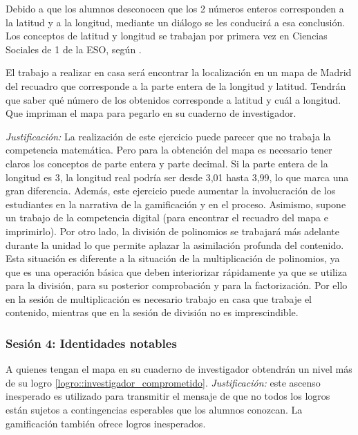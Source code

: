 Debido a que los alumnos desconocen que los 2 números enteros corresponden a la latitud y a la longitud, mediante un diálogo se les conducirá a esa conclusión.
%
Los conceptos de latitud y longitud se trabajan por primera vez en Ciencias Sociales de 1 de la ESO, según \bocm.


El trabajo a realizar en casa será encontrar la localización en un mapa de Madrid del recuadro que corresponde a la parte entera de la longitud y latitud.
%
Tendrán que saber qué número de los obtenidos corresponde a latitud y cuál a longitud.
%
Que impriman el mapa para pegarlo en su cuaderno de investigador.

\textit{
	Justificación:
}
%
La realización de este ejercicio puede parecer que no trabaja la competencia matemática. 
%
Pero para la obtención del mapa es necesario tener claros los conceptos de parte entera y parte decimal.
%
Si la parte entera de la longitud es 3, la longitud real podría ser desde 3,01 hasta 3,99, lo que marca una gran diferencia.
%
Además, este ejercicio puede aumentar la involucración de los estudiantes en la narrativa de la gamificación y en el proceso.
%
Asimismo, supone un trabajo de la competencia digital (para encontrar el recuadro del mapa e imprimirlo).
%
Por otro lado, la división de polinomios se trabajará más adelante durante la unidad lo que permite aplazar la asimilación profunda del contenido.
%
Esta situación es diferente a la situación de la multiplicación de polinomios, ya que es una operación básica que deben interiorizar rápidamente ya que se utiliza para la división, para su posterior comprobación y para la factorización.
%
Por ello en la sesión de multiplicación es necesario trabajo en casa que trabaje el contenido, mientras que en la sesión de división no es imprescindible.



\subsubsection{Sesión 4: Identidades notables}

A quienes tengan el mapa en su cuaderno de investigador obtendrán un nivel más de su logro \ref{logro::investigador_comprometido}.
%
\textit{Justificación:} este ascenso inesperado es utilizado para transmitir el mensaje de que no todos los logros están sujetos a contingencias esperables que los alumnos conozcan.
%
La gamificación también ofrece logros inesperados.
%

